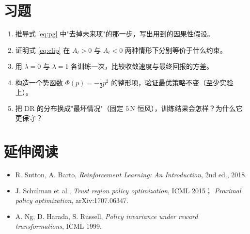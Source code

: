 \section*{习题}
\begin{enumerate}[leftmargin=2em,itemsep=6pt]
  \item 推导式 \eqref{eq:pg} 中"去掉未来项"的那一步，写出用到的因果性假设。
  \item 证明式 \eqref{eq:clip} 在 $A_t>0$ 与 $A_t<0$ 两种情形下分别等价于什么约束。
  \item 用 $\lambda=0$ 与 $\lambda=1$ 各训练一次，比较收敛速度与最终回报的方差。
  \item 构造一个势函数 $\Phi(p)=-\tfrac12 p^2$ 的整形项，验证最优策略不变（至少实验上）。
  \item 把 DR 的分布换成"最坏情况"（固定 $5$\,N 恒风），训练结果会怎样？为什么它更保守？
\end{enumerate}

\section*{延伸阅读}
\begin{itemize}[leftmargin=2em,itemsep=2pt]
  \item R. Sutton, A. Barto, \emph{Reinforcement Learning: An Introduction}, 2nd ed., 2018.
  \item J. Schulman et al., \emph{Trust region policy optimization}, ICML 2015；
        \emph{Proximal policy optimization}, arXiv:1707.06347.
  \item A. Ng, D. Harada, S. Russell, \emph{Policy invariance under reward transformations}, ICML 1999.
\end{itemize}
